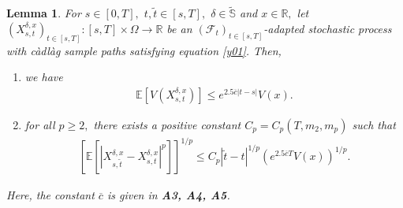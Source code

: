 \documentclass[11pt]{article}
\theoremstyle{theorem}
\newtheorem{Lem}[Def]{Lemma}
\theoremstyle{definition}
\newcommand{\bR}{\mathbb{R}}
\newcommand{\mf}{\mathcal{F}}
\newcommand{\1}{{\bf 1}}
\begin{document}
\begin{Lem}
\label{Lem3.3}
For $s\in [0, T],$ $t, \widetilde{t} \in [s, T],$ $ \delta \in \widetilde{\mathbb{S}}$ and $ x\in \bR,$ let $(X^{\delta,x}_{s,t})_{t\in[s,T]}:[s,T]  \times\Omega\to\mathbb{R} $ 
be an $(\mf_t)_{t\in[s,T]}$-adapted stochastic process with c\`adl\`ag  sample paths satisfying equation \eqref{y01}. 
Then, 
\begin{enumerate}
   \item [\textup{(i)}] we have
\begin{align*}
\mathbb{E}\left[V(X^{\delta, x}_{s,t})\right] \leq e^{2.5 \overline{c}|t-s|}V(x).
\end{align*} 
\item [\textup{(ii)}] for all $p\ge 2,$ there exists a positive constant $C_p=C_p(T, m_2, m_p)$ such that \begin{align*}
\left[\mathbb{E}\left[\left|X^{\delta, x}_{s,\widetilde{t}}-X^{\delta, x}_{s,t}\right|^p\right]\right]^{1/p} 
 \leq C_p |\widetilde{t} -t|^{1/p} (e^{2.5\overline{c}T}V(x))^{1/p}.
\end{align*} 
\end{enumerate}
Here, the constant $\overline{c}$ is given in {\bf A3, A4, A5}. 
 \end{Lem}
\end{document}
